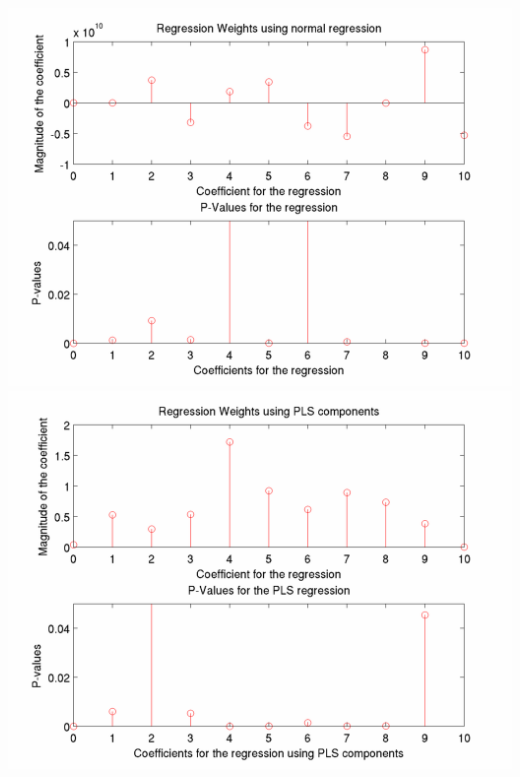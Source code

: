 \documentclass[12pt]{article}
\begin{document}
\includegraphics[scale=0.2]{regression_weights_p_value.png}
\includegraphics[scale=0.2]{glmfit_regression_pls.png}
\end{document}
